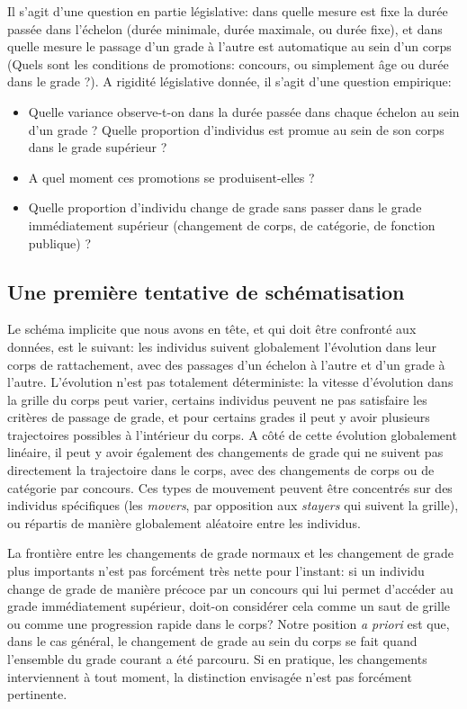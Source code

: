 \documentclass[11pt,a4paper]{article}
\begin{document}
Il s'agit d'une question en partie législative: dans quelle mesure est fixe la durée passée dans l'échelon (durée minimale, durée maximale, ou durée fixe), et dans quelle mesure le passage d'un grade à l'autre est automatique au sein d'un corps (Quels sont les conditions de promotions: concours, ou simplement âge ou durée dans le grade ?). A rigidité législative donnée, il s'agit d'une question empirique:
\begin{itemize}
    \item Quelle variance observe-t-on dans la durée passée dans chaque échelon au sein d'un grade ? Quelle proportion d'individus est promue au sein de son corps dans le grade supérieur ?
   \item A quel moment ces promotions se produisent-elles ? 
   \item Quelle proportion d'individu change de grade sans passer dans le grade immédiatement supérieur (changement de corps, de catégorie, de fonction publique) ?
\end{itemize}  


\subsection*{Une première tentative de schématisation}

Le schéma implicite que nous avons en tête, et qui doit être confronté aux données, est le suivant: les individus suivent globalement l'évolution dans leur corps de rattachement, avec des passages d'un échelon à l'autre et d'un grade à l'autre. L'évolution n'est pas totalement déterministe: la vitesse d'évolution dans la grille du corps peut varier, certains individus peuvent ne pas satisfaire les critères de passage de grade, et pour certains grades il peut y avoir plusieurs trajectoires possibles à l'intérieur du corps. A côté de cette évolution globalement linéaire, il peut y avoir également des changements de grade qui ne suivent pas directement la trajectoire dans le corps, avec des changements de corps ou de catégorie par concours. Ces types de mouvement peuvent être concentrés sur des individus spécifiques (les \textit{movers}, par opposition aux \textit{stayers} qui suivent la grille), ou répartis de manière globalement aléatoire entre les individus. 

La frontière entre les changements de grade \og normaux \fg{}  et les changement de grade plus importants n'est pas forcément très nette pour l'instant: si un individu change de grade de manière précoce par un concours qui lui permet d'accéder au grade immédiatement supérieur, doit-on considérer cela comme un saut de grille ou comme une progression rapide dans le corps? Notre position \textit{a priori} est que, dans le cas général, le changement de grade au sein du corps se fait quand l'ensemble du grade courant a été parcouru. Si en pratique, les changements interviennent à tout moment, la distinction envisagée n'est pas forcément pertinente.
\end{document}
